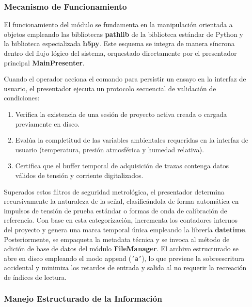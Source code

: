 \subsubsection{Mecanismo de Funcionamiento}
\label{subsubsec:mecanismo_funcionamiento}

El funcionamiento del módulo se fundamenta en la manipulación orientada a objetos empleando las bibliotecas \textbf{pathlib} de la biblioteca estándar de Python y la biblioteca especializada \textbf{h5py}. Este esquema se integra de manera síncrona dentro del flujo lógico del sistema, orquestado directamente por el presentador principal \textbf{MainPresenter}.

Cuando el operador acciona el comando para persistir un ensayo en la interfaz de usuario, el presentador ejecuta un protocolo secuencial de validación de condiciones:
\begin{enumerate}
    \item Verifica la existencia de una sesión de proyecto activa creada o cargada previamente en disco.
    \item Evalúa la completitud de las variables ambientales requeridas en la interfaz de usuario (temperatura, presión atmosférica y humedad relativa).
    \item Certifica que el buffer temporal de adquisición de trazas contenga datos válidos de tensión y corriente digitalizados.
\end{enumerate}

Superados estos filtros de seguridad metrológica, el presentador determina recursivamente la naturaleza de la señal, clasificándola de forma automática en impulsos de tensión de prueba estándar o formas de onda de calibración de referencia. Con base en esta categorización, incrementa los contadores internos del proyecto y genera una marca temporal única empleando la librería \textbf{datetime}. Posteriormente, se empaqueta la metadata técnica y se invoca al método de adición de base de datos del módulo \textbf{FileManager}. El archivo estructurado se abre en disco empleando el modo append (\texttt{'a'}), lo que previene la sobreescritura accidental y minimiza los retardos de entrada y salida al no requerir la recreación de índices de lectura.

\subsubsection{Manejo Estructurado de la Información}
\label{subsubsec:manejo_informacion}

